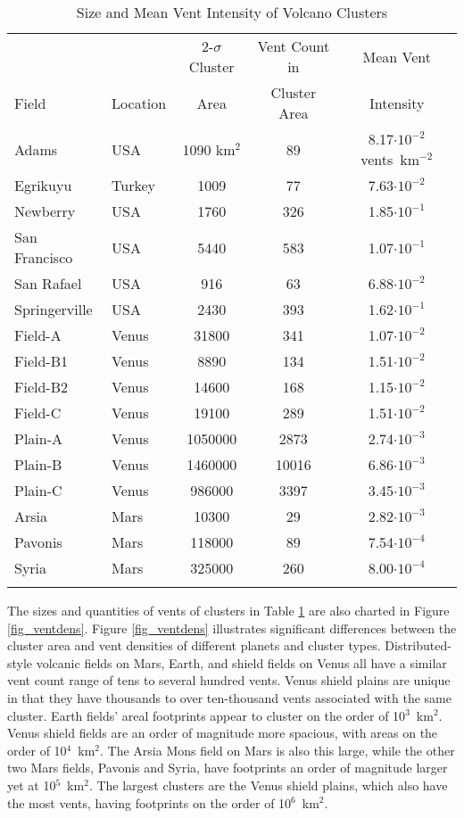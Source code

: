 \begin{table}
\centering
\caption{Size and Mean Vent Intensity of Volcano Clusters}
\begin{tabular}{l l c c c}
\toprule
& & 2-$\sigma$ Cluster & Vent Count in	&	Mean Vent\\
Field	&	Location & Area & Cluster Area	&	Intensity\\
\midrule
Adams	&	USA	&	1090	km$^2$	&	89 &	8.17$\cdot10^{-2}$ vents~km$^{-2}$	\\
Egrikuyu	&	Turkey	&	1009 &	77	&	7.63$\cdot10^{-2}$	\\
Newberry	&	USA	&	1760	&	326	&	1.85$\cdot10^{-1}$	\\
San Francisco	&	USA	&	5440	&	583	&	1.07$\cdot10^{-1}$	\\
San Rafael	&	USA	&	916	&	63	&	6.88$\cdot10^{-2}$	\\
Springerville	&	USA	&	2430	&	393	&	1.62$\cdot10^{-1}$	\\
Field-A	&	Venus	&	31800	&	341	&	1.07$\cdot10^{-2}$	\\
Field-B1	&	Venus	&	8890	&	134	&	1.51$\cdot10^{-2}$	\\
Field-B2	&	Venus	&	14600	&	168	&	1.15$\cdot10^{-2}$	\\
Field-C	&	Venus	&	19100	&	289	&	1.51$\cdot10^{-2}$	\\
Plain-A	&	Venus	&	1050000	&	2873	&	2.74$\cdot10^{-3}$	\\
Plain-B	&	Venus	&	1460000	&	10016	&	6.86$\cdot10^{-3}$	\\
Plain-C	&	Venus	&	986000	&	3397	&	3.45$\cdot10^{-3}$	\\
Arsia	&	Mars	&	10300	&	29	&	2.82$\cdot10^{-3}$	\\
Pavonis	&	Mars	&	118000	&	89	&	7.54$\cdot10^{-4}$	\\
Syria	&	Mars	&	325000	&	260	&	8.00$\cdot10^{-4}$	\\
\bottomrule
\label{tab_results}
\end{tabular}
\end{table}

The sizes and quantities of vents of clusters in Table \ref{tab_results} are also charted in Figure \ref{fig_ventdens}. Figure \ref{fig_ventdens} illustrates significant differences between the cluster area and vent densities of different planets and cluster types. Distributed-style volcanic fields on Mars, Earth, and shield fields on Venus all have a similar vent count range of tens to several hundred vents. Venus shield plains are unique in that they have thousands to over ten-thousand vents associated with the same cluster. Earth fields' areal footprints appear to cluster on the order of 10$^3$~km$^2$. Venus shield fields are an order of magnitude more spacious, with areas on the order of 10$^4$~km$^2$. The Arsia Mons field on Mars is also this large, while the other two Mars fields, Pavonis and Syria, have footprints an order of magnitude larger yet at 10$^5$~km$^2$. The largest clusters are the Venus shield plains, which also have the most vents, having footprints on the order of 10$^6$~km$^2$.

